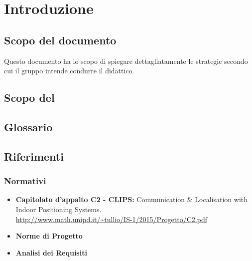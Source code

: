 \section{Introduzione}
\label{introduzione}
\subsection{Scopo del documento} 
Questo documento ha lo scopo di spiegare dettagliatamente le strategie secondo cui il gruppo \AUTORE{} intende condurre il  didattico. 
\subsection{Scopo del }
\SCOPO
\subsection{Glossario}
\GLOSSARIO
\subsection{Riferimenti}
\subsubsection{Normativi}
\begin{itemize}
	\item \textbf{Capitolato d'appalto C2 - CLIPS:} Communication \& Localisation with Indoor Positioning Systems. \\
	\url{http://www.math.unipd.it/~tullio/IS-1/2015/Progetto/C2.pdf}
	\item \textbf{Norme di Progetto} \\ \NPdoc
	\item \textbf{Analisi dei Requisiti} \\ \ARdoc
\end{itemize}	

